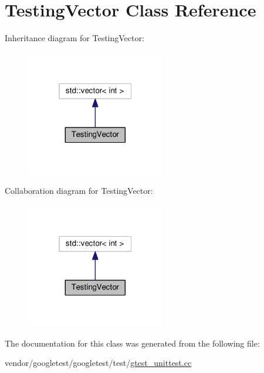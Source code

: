 \hypertarget{classTestingVector}{}\section{Testing\+Vector Class Reference}
\label{classTestingVector}


Inheritance diagram for Testing\+Vector\+:
\nopagebreak
\begin{figure}[H]
\begin{center}
\leavevmode
\includegraphics[width=172pt]{classTestingVector__inherit__graph}
\end{center}
\end{figure}


Collaboration diagram for Testing\+Vector\+:
\nopagebreak
\begin{figure}[H]
\begin{center}
\leavevmode
\includegraphics[width=172pt]{classTestingVector__coll__graph}
\end{center}
\end{figure}


The documentation for this class was generated from the following file\+:\begin{DoxyCompactItemize}
\item 
vendor/googletest/googletest/test/\hyperlink{gtest__unittest_8cc}{gtest\+\_\+unittest.\+cc}\end{DoxyCompactItemize}
